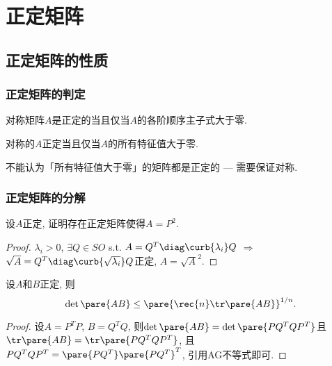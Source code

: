 \documentclass[hidelinks]{ctexart}
\begin{document}

\section{正定矩阵} %
\label{sec:正定矩阵}

\subsection{正定矩阵的性质} %
\label{sub:正定矩阵的性质}

\subsubsection{正定矩阵的判定} %
\label{ssub:正定矩阵的判定}

\begin{theorem}[Sylvester判准]
    对称矩阵$A$是正定的当且仅当$A$的各阶顺序主子式大于零.
\end{theorem}

\begin{proposition}
    对称的$A$正定当且仅当$A$的所有特征值大于零.
\end{proposition}

\begin{pitfall}
    不能认为「所有特征值大于零」的矩阵都是正定的 --- 需要保证对称.
\end{pitfall}


\subsubsection{正定矩阵的分解} %
\label{ssub:正定矩阵的分解}

\begin{ex}
    设$A$正定, 证明存在正定矩阵使得$A=P^2$.
\end{ex}
\begin{proof}
    $\lambda_i>0$, $\exists Q\in SO$ s.t. $A = Q^T \diag\curb{\lambda_i} Q$ $\Rightarrow$ $\sqrt{A} = Q^T \diag\curb{\sqrt{\lambda_i}} Q$正定, $A = \sqrt{A}^2$.
\end{proof}
\begin{ex}
    设$A$和$B$正定, 则
    \[ \det \pare{AB} \le \pare{\rec{n}\tr \pare{AB}}^{1/n}. \]
\end{ex}
\begin{proof}
    设$A=P^T P$, $B = Q^T Q$, 则$\det \pare{AB} = \det \pare{PQ^T QP^T}$且$\tr \pare{AB} = \tr \pare{PQ^T QP^T}$, 且$PQ^TQP^T=\pare{PQ^T}\pare{PQ^T}^T$, 引用AG不等式即可.
\end{proof}
\end{document}
